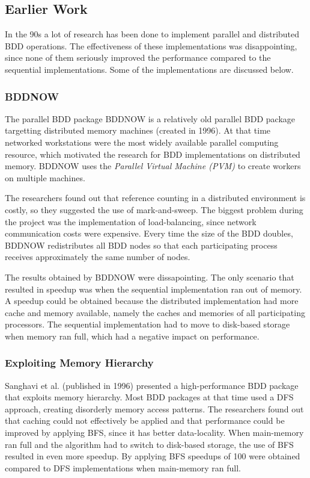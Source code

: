 \subsection{Earlier Work}
In the 90s a lot of research has been done to implement parallel and distributed BDD operations. The effectiveness of these implementations was disappointing, since none of them seriously improved the performance compared to the sequential implementations. Some of the implementations are discussed below.

\subsubsection{BDDNOW}
The parallel BDD package BDDNOW \cite{BDDNOW:parallel_bdd_package} is a relatively old parallel BDD package targetting distributed memory machines (created in 1996). At that time networked workstations were the most widely available parallel computing resource, which motivated the research for BDD implementations on distributed memory. BDDNOW uses the \emph{Parallel Virtual Machine (PVM)} \cite{geist1994pvm} to create workers on multiple machines.

The researchers found out that reference counting in a distributed environment is costly, so they suggested the use of mark-and-sweep. The biggest problem during the project was the implementation of load-balancing, since network communication costs were expensive. Every time the size of the BDD doubles, BDDNOW redistributes all BDD nodes so that each participating process receives approximately the same number of nodes.  

The results obtained by BDDNOW were dissapointing. The only scenario that resulted in speedup was when the sequential implementation ran out of memory. A speedup could be obtained because the distributed implementation had more cache and memory available, namely the caches and memories of all participating processors. The sequential implementation had to move to disk-based storage when memory ran full, which had a negative impact on performance.

\subsubsection{Exploiting Memory Hierarchy}
Sanghavi et al. \cite{545652} (published in 1996) presented a high-performance BDD package that exploits memory hierarchy. Most BDD packages at that time used a DFS approach, creating disorderly memory access patterns. The researchers found out that caching could not effectively be applied and that performance could be improved by applying BFS, since it has better data-locality.  When main-memory ran full and the algorithm had to switch to disk-based storage, the use of BFS resulted in even more speedup. By applying BFS speedups of 100 were obtained compared to DFS implementations when main-memory ran full.

